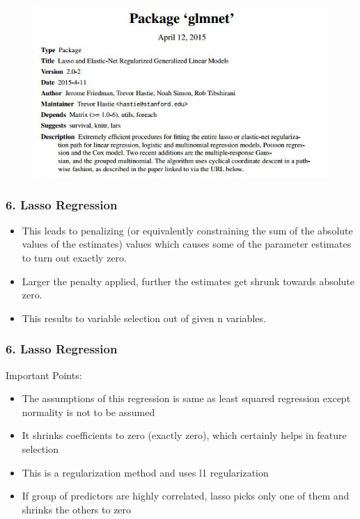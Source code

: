 \documentclass{beamer}
\begin{document}
\begin{frame}
	\begin{figure}
\centering
\includegraphics[width=0.9\linewidth]{images/CRAN-glmnet}
\end{figure}

\end{frame}
\begin{frame}
	\frametitle{6. Lasso Regression}
	\large
	\begin{itemize}
\item 	This leads to penalizing (or equivalently constraining the sum of the absolute values of the estimates) values which causes some of the parameter estimates to turn out exactly zero. 
\item Larger the penalty applied, further the estimates get shrunk towards absolute zero. 
\item This results to variable selection out of given n variables.
	\end{itemize}

\end{frame}
\begin{frame}
	\frametitle{6. Lasso Regression}
	\large
	Important Points:
	\begin{itemize}
\item 	The assumptions of this regression is same as least squared regression except normality is not to be assumed
\item 	It shrinks coefficients to zero (exactly zero), which certainly helps in feature selection
\item 	This is a regularization method and uses l1 regularization
\item 	If group of predictors are highly correlated, lasso picks only one of them and shrinks the others to zero
	\end{itemize}

\end{frame}
\end{document}
